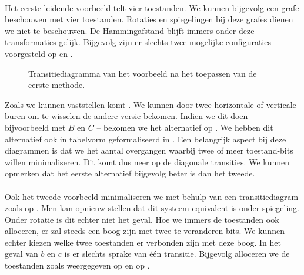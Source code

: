 \paragraph{}
Het eerste leidende voorbeeld telt vier toestanden. We kunnen bijgevolg een grafe beschouwen met vier toestanden. Rotaties en spiegelingen bij deze grafes dienen we niet te beschouwen. De Hammingafstand blijft immers onder deze transformaties gelijk. Bijgevolg zijn er slechts twee mogelijke configuraties voorgesteld op  en .
\begin{figure}[hbt]
\centering
{}
\caption{Transitiediagramma van het voorbeeld na het toepassen van de eerste methode.}
\end{figure}
Zoals we kunnen vaststellen komt . We kunnen door twee horizontale of verticale buren om te wisselen de andere versie bekomen. Indien we dit doen -- bijvoorbeeld met $B$ en $C$ -- bekomen we het alternatief op . We hebben dit alternatief ook in tabelvorm geformaliseerd in . Een belangrijk aspect bij deze diagrammen is dat we het aantal overgangen waarbij twee of meer toestand-bits willen minimaliseren. Dit komt dus neer op de diagonale transities. We kunnen opmerken dat het eerste alternatief bijgevolg beter is dan het tweede.
\paragraph{}
Ook het tweede voorbeeld minimaliseren we met behulp van een transitiediagram zoals op . Men kan opnieuw stellen dat dit systeem equivalent is onder spiegeling. Onder rotatie is dit echter niet het geval. Hoe we immers de toestanden ook alloceren, er zal steeds een boog zijn met twee te veranderen bits. We kunnen echter kiezen welke twee toestanden er verbonden zijn met deze boog. In het geval van $b$ en $c$ is er slechts sprake van \'e\'en transitie. Bijgevolg alloceren we de toestanden zoals weergegeven op  en op .
